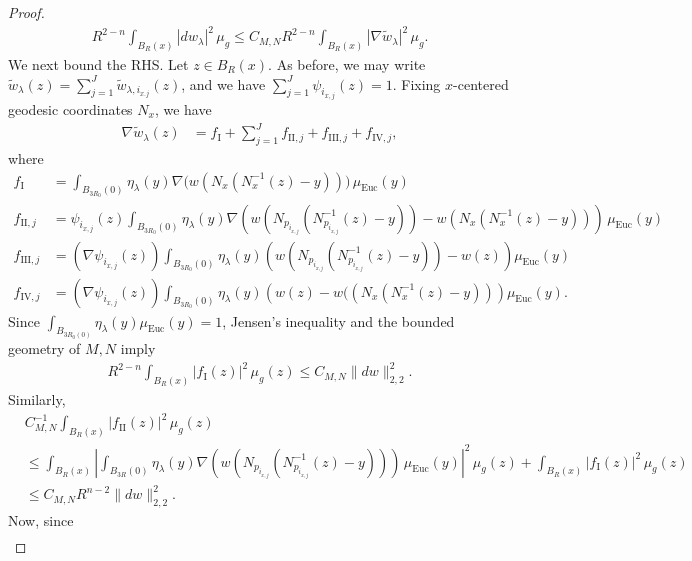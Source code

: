\documentclass[12pt]{amsart}
\renewcommand{\1}{{\mathbf 1}}
\theoremstyle{others}
\numberwithin{equation}{section}
\begin{document}
\begin{proof}
\begin{align*}
        R^{2-n}\int_{B_R(x)} |d w_\lambda|^2 \, \mu_g \leq C_{M, N}R^{2-n}\int_{B_R(x)} |\nabla  \tilde{w}_\lambda|^2 \, \mu_g.
    \end{align*} We next bound the RHS. Let \(z \in B_R(x)\). As before, we may write \(\tilde{w}_\lambda(z) = \sum_{j = 1}^J \tilde{w}_{\lambda, i_{x. j}}(z)\), and we have \(\sum_{j = 1}^J \psi_{i_{x, j}}(z) = 1\). Fixing \(x\)-centered geodesic coordinates \(N_x\), we have
    \begin{align*}
        \nabla \tilde{w}_\lambda(z) &= f_{\text{I}} + \sum_{j = 1}^J f_{\text{II}, j} + f_{\text{III}, j} + f_{\text{IV}, j},
    \end{align*} where
    \begin{align*}
        f_{\text{I}} &= \int_{B_{3R_0}(0)} \eta_\lambda(y) \nabla\big(w(N_x(N_x^{-1}(z) - y))\big) \, \mu_{\text{Euc}}(y) \\
        f_{\text{II}, j} &= \psi_{i_{x, j}}(z) \int_{B_{3R_0}(0)} \eta_\lambda(y) \nabla \left(w\left(N_{p_{i_{x, j}}}\left(N_{p_{i_{x, j}}}^{-1}(z)-y\right)\right)-w(N_x(N_x^{-1}(z) - y))\right) \, \mu_{\text{Euc}}(y) \\
        f_{\text{III}, j} &= (\nabla \psi_{i_{x, j}}(z))\int_{B_{3R_0}(0)} \eta_\lambda(y) \left(w\left(N_{p_{i_{x, j}}}\left(N_{p_{i_{x, j}}}^{-1}(z)-y\right)\right) - w(z)\right)\mu_{\text{Euc}}(y) \\
        f_{\text{IV}, j} &= (\nabla \psi_{i_{x, j}}(z))\int_{B_{3R_0}(0)} \eta_\lambda(y) \left(w(z)-w(\left(N_{x}\left(N_{x}^{-1}(z)-y\right)\right)\right)\mu_{\text{Euc}}(y).
    \end{align*} Since \(\int_{B_{3R_0(0)}} \eta_\lambda(y) \mu_{\text{Euc}}(y) = 1\), Jensen's inequality and the bounded geometry of \(M, N\) imply
    \begin{align*}
        R^{2-n} \int_{B_R(x)} |f_{\text{I}}(z)|^2 \, \mu_g(z) \leq C_{M, N} \|dw\|_{2, 2}^2.
    \end{align*}Similarly,
    \begin{align*}
        &C_{M, N}^{-1}\int_{B_R(x)} |f_{\text{II}}(z)|^2 \, \mu_g(z) \\
        &\leq \int_{B_R(x)} \left|\int_{B_{3R}(0)} \eta_\lambda(y) \nabla\left(w\left(N_{p_{i_{x, j}}}\left(N_{p_{i_{x, j}}}^{-1}(z)-y\right)\right)\right) \, \mu_{\text{Euc}}(y) \right|^2 \, \mu_g(z) +\int_{B_R(x)} |f_{\text{I}}(z)|^2 \, \mu_g(z) \\
        &\leq C_{M, N} R^{n-2} \|dw\|_{2, 2}^2.
    \end{align*} Now, since
    \begin{align*}

\end{align*}
\end{proof}
\end{document}
